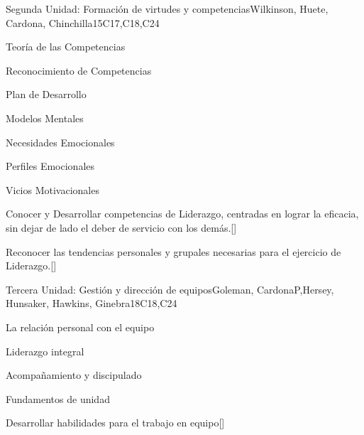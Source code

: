 \begin{syllabus}
\begin{unit}{}{Segunda Unidad: Formación de virtudes y competencias}{Wilkinson, Huete, Cardona, Chinchilla}{15}{C17,C18,C24}
\begin{topics}
	
	\item Teoría de las Competencias 
	\item Reconocimiento de Competencias
	\item Plan de Desarrollo
	\item Modelos Mentales
	\item Necesidades Emocionales
	\item Perfiles Emocionales
	\item Vicios Motivacionales

\end{topics}
\begin{learningoutcomes}
	\item Conocer y Desarrollar competencias de Liderazgo, centradas en lograr la eficacia, sin dejar de lado el deber de servicio con los demás.[\Familiarity]
	\item Reconocer las tendencias personales y grupales necesarias para el ejercicio de Liderazgo.[\Familiarity]
\end{learningoutcomes}
\end{unit}

\begin{unit}{}{Tercera Unidad: Gestión y dirección de equipos}{Goleman, CardonaP,Hersey, Hunsaker, Hawkins, Ginebra}{18}{C18,C24}
\begin{topics}
	\item La relación personal con el equipo
	\item Liderazgo integral
	\item Acompañamiento y discipulado
	\item Fundamentos de unidad
\end{topics}
\begin{learningoutcomes}
	\item Desarrollar habilidades para el trabajo en equipo[\Familiarity]
\end{learningoutcomes}
\end{unit}



\begin{coursebibliography}
\end{coursebibliography}

\end{syllabus}
